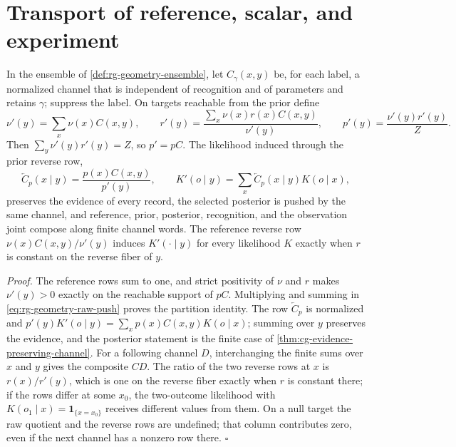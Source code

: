 \section{Transport of reference, scalar, and experiment}
\label{sec:rg-geometry-transport}

In the ensemble of \cref{def:rg-geometry-ensemble}, let $C_\gamma(x,y)$ be,
for each label, a normalized channel that is independent of recognition and
of parameters and retains $\gamma$; suppress the label. On targets reachable
from the prior define
\begin{equation}
 \nu'(y)=\sum_x\nu(x)C(x,y),\qquad
 r'(y)=\frac{\sum_x\nu(x)r(x)C(x,y)}{\nu'(y)},\qquad
 p'(y)=\frac{\nu'(y)r'(y)}{Z}.
 \label{eq:rg-geometry-raw-push}
\end{equation}
Then $\sum_y\nu'(y)r'(y)=Z$, so $p'=pC$. The likelihood induced through the
prior reverse row,
\begin{equation}
 \overleftarrow C_p(x\mid y)=\frac{p(x)C(x,y)}{p'(y)},\qquad
 K'(o\mid y)=\sum_x\overleftarrow C_p(x\mid y)K(o\mid x),
 \label{eq:rg-geometry-likelihood}
\end{equation}
preserves the evidence of every record, the selected posterior is pushed by
the same channel, and reference, prior, posterior, recognition, and the
observation joint compose along finite channel words. The reference reverse
row $\nu(x)C(x,y)/\nu'(y)$ induces $K'(\cdot\mid y)$ for every likelihood $K$
exactly when $r$ is constant on the reverse fiber of $y$.

\noindent\emph{Proof.}
The reference rows sum to one, and strict positivity of $\nu$ and $r$ makes
$\nu'(y)>0$ exactly on the reachable support of $pC$. Multiplying and
summing in \cref{eq:rg-geometry-raw-push} proves the partition identity.
The row $\overleftarrow C_p$ is normalized and
$p'(y)K'(o\mid y)=\sum_xp(x)C(x,y)K(o\mid x)$; summing over $y$ preserves the
evidence, and the posterior statement is the finite case of
\cref{thm:cg-evidence-preserving-channel}. For a following channel $D$,
interchanging the finite sums over $x$ and $y$ gives the composite $CD$. The
ratio of the two reverse rows at $x$ is $r(x)/r'(y)$, which is one on the
reverse fiber exactly when $r$ is constant there; if the rows differ at some
$x_0$, the two-outcome likelihood with $K(o_1\mid x)=\mathbf1_{\{x=x_0\}}$
receives different values from them. On a null target the raw
quotient and the reverse rows are undefined; that column contributes zero,
even if the next channel has a nonzero row there. $\square$

